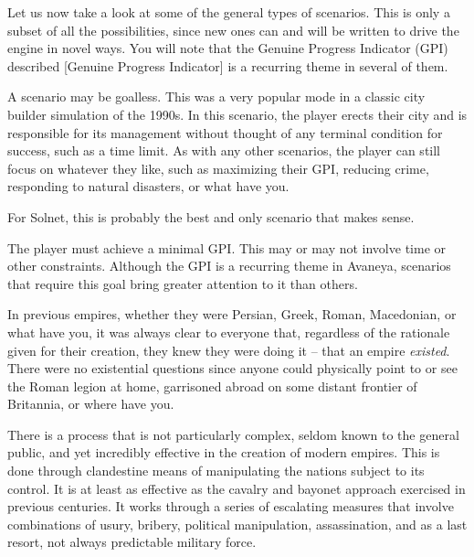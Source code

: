 Let us now take a look at some of the general types of scenarios. This is only a subset of all the possibilities, since new ones can and will be written to drive the engine in novel ways. You will note that the Genuine Progress Indicator (GPI) described [Genuine Progress Indicator] is a recurring theme in several of them.


A scenario may be goalless. This was a very popular mode in a classic city builder simulation of the 1990s. In this scenario, the player erects their city and is responsible for its management without thought of any terminal condition for success, such as a time limit. As with any other scenarios, the player can still focus on whatever they like, such as maximizing their GPI, reducing crime, responding to natural disasters, or what have you. 

For Solnet, this is probably the best and only scenario that makes sense.


The player must achieve a minimal GPI. This may or may not involve time or other constraints. Although the GPI is a recurring theme in Avaneya, scenarios that require this goal bring greater attention to it than others.




In previous empires, whether they were Persian, Greek, Roman, Macedonian, or what have you, it was always clear to everyone that, regardless of the rationale given for their creation, they knew they were doing it -- that an empire {\it existed}. There were no existential questions since anyone could physically point to or see the Roman legion at home, garrisoned abroad on some distant frontier of Britannia, or where have you.

There is a process that is not particularly complex, seldom known to the general public, and yet incredibly effective in the creation of modern empires. This is done through clandestine means of manipulating the nations subject to its control. It is at least as effective as the cavalry and bayonet approach exercised in previous centuries. It works through a series of escalating measures that involve combinations of usury, bribery, political manipulation, assassination, and as a last resort, not always predictable military force. 

